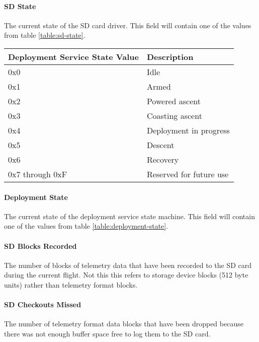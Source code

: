 \paragraph{SD State}
The current state of the SD card driver. This field will contain one of the values from table \ref{table:sd-state}.

\begin{table*}[htb]
    \centering
    \begin{tabular}{@{}ll@{}}
        \toprule
        Deployment Service State Value & Description             \\
        \midrule
        0x0                            & Idle                    \\
        0x1                            & Armed                   \\
        0x2                            & Powered ascent          \\
        0x3                            & Coasting ascent         \\
        0x4                            & Deployment in progress  \\
        0x5                            & Descent                 \\
        0x6                            & Recovery                \\
        0x7 through 0xF                & Reserved for future use \\
        \bottomrule
    \end{tabular}
    \caption{Deployment Service States}
    \label{table:deployment-state}
\end{table*}

\paragraph{Deployment State}
The current state of the deployment service state machine. This field will contain one of the values from table
\ref{table:deployment-state}.

\paragraph{SD Blocks Recorded}
The number of blocks of telemetry data that have been recorded to the SD card during the current flight. Not this this
refers to storage device blocks (512 byte units) rather than telemetry format blocks.

\paragraph{SD Checkouts Missed}
The number of telemetry format data blocks that have been dropped because there was not enough buffer space free to log
them to the SD card.

